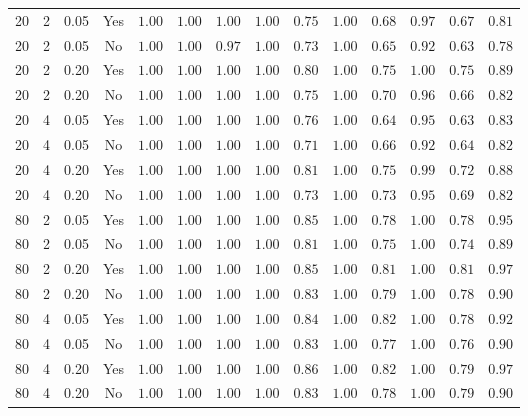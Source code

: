 \begin{tabular}{c c c c c c c c c c c c c c}
20 & 2 & 0.05 & Yes & $1.00$ & $1.00$ & $1.00$ & $1.00$ & $0.75$ & $1.00$ & $0.68$ & $0.97$ & $0.67$ & $0.81$\\ 
20 & 2 & 0.05 & No & $1.00$ & $1.00$ & $0.97$ & $1.00$ & $0.73$ & $1.00$ & $0.65$ & $0.92$ & $0.63$ & $0.78$\\ 
20 & 2 & 0.20 & Yes & $1.00$ & $1.00$ & $1.00$ & $1.00$ & $0.80$ & $1.00$ & $0.75$ & $1.00$ & $0.75$ & $0.89$\\ 
20 & 2 & 0.20 & No & $1.00$ & $1.00$ & $1.00$ & $1.00$ & $0.75$ & $1.00$ & $0.70$ & $0.96$ & $0.66$ & $0.82$\\ 
20 & 4 & 0.05 & Yes & $1.00$ & $1.00$ & $1.00$ & $1.00$ & $0.76$ & $1.00$ & $0.64$ & $0.95$ & $0.63$ & $0.83$\\ 
20 & 4 & 0.05 & No & $1.00$ & $1.00$ & $1.00$ & $1.00$ & $0.71$ & $1.00$ & $0.66$ & $0.92$ & $0.64$ & $0.82$\\ 
20 & 4 & 0.20 & Yes & $1.00$ & $1.00$ & $1.00$ & $1.00$ & $0.81$ & $1.00$ & $0.75$ & $0.99$ & $0.72$ & $0.88$\\ 
20 & 4 & 0.20 & No & $1.00$ & $1.00$ & $1.00$ & $1.00$ & $0.73$ & $1.00$ & $0.73$ & $0.95$ & $0.69$ & $0.82$\\ 
80 & 2 & 0.05 & Yes & $1.00$ & $1.00$ & $1.00$ & $1.00$ & $0.85$ & $1.00$ & $0.78$ & $1.00$ & $0.78$ & $0.95$\\ 
80 & 2 & 0.05 & No & $1.00$ & $1.00$ & $1.00$ & $1.00$ & $0.81$ & $1.00$ & $0.75$ & $1.00$ & $0.74$ & $0.89$\\ 
80 & 2 & 0.20 & Yes & $1.00$ & $1.00$ & $1.00$ & $1.00$ & $0.85$ & $1.00$ & $0.81$ & $1.00$ & $0.81$ & $0.97$\\ 
80 & 2 & 0.20 & No & $1.00$ & $1.00$ & $1.00$ & $1.00$ & $0.83$ & $1.00$ & $0.79$ & $1.00$ & $0.78$ & $0.90$\\ 
80 & 4 & 0.05 & Yes & $1.00$ & $1.00$ & $1.00$ & $1.00$ & $0.84$ & $1.00$ & $0.82$ & $1.00$ & $0.78$ & $0.92$\\ 
80 & 4 & 0.05 & No & $1.00$ & $1.00$ & $1.00$ & $1.00$ & $0.83$ & $1.00$ & $0.77$ & $1.00$ & $0.76$ & $0.90$\\ 
80 & 4 & 0.20 & Yes & $1.00$ & $1.00$ & $1.00$ & $1.00$ & $0.86$ & $1.00$ & $0.82$ & $1.00$ & $0.79$ & $0.97$\\ 
80 & 4 & 0.20 & No & $1.00$ & $1.00$ & $1.00$ & $1.00$ & $0.83$ & $1.00$ & $0.78$ & $1.00$ & $0.79$ & $0.90$\\




\bottomrule
\end{tabular}